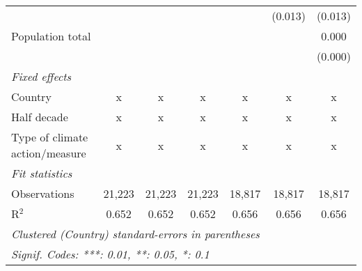 \begin{tabular}{lcccccc}
                                                            &         &               &               &               & (0.013)       & (0.013)\\   
   Population total                                         &         &               &               &               &               & 0.000\\   
                                                            &         &               &               &               &               & (0.000)\\   
   \emph{Fixed effects}\\
   Country                                                  & x       & x             & x             & x             & x             & x\\  
   Half decade                                              & x       & x             & x             & x             & x             & x\\  
   Type of climate action/measure                           & x       & x             & x             & x             & x             & x\\  
   \midrule \emph{Fit statistics}\\
   Observations                                             & 21,223  & 21,223        & 21,223        & 18,817        & 18,817        & 18,817\\  
   R$^2$                                                    & 0.652   & 0.652         & 0.652         & 0.656         & 0.656         & 0.656\\  
   \midrule
   \multicolumn{7}{l}{\emph{Clustered (Country) standard-errors in parentheses}}\\
   \multicolumn{7}{l}{\emph{Signif. Codes: ***: 0.01, **: 0.05, *: 0.1}}\\
\end{tabular}
\par\endgroup


